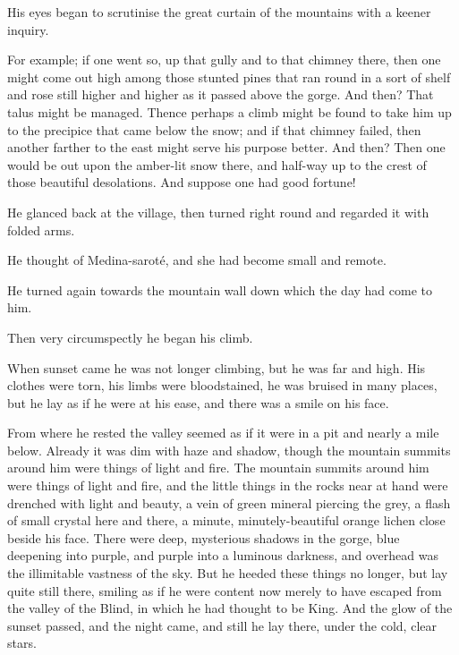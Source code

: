 \documentclass[courier]{sffms}
\begin{document}
His eyes began to scrutinise the great curtain of the mountains with a
keener inquiry.

For example; if one went so, up that gully and to that chimney there,
then one might come out high among those stunted pines that ran round
in a sort of shelf and rose still higher and higher as it passed above
the gorge. And then? That talus might be managed. Thence perhaps a
climb might be found to take him up to the precipice that came below
the snow; and if that chimney failed, then another farther to the east
might serve his purpose better. And then? Then one would be out upon
the amber-lit snow there, and half-way up to the crest of those
beautiful desolations. And suppose one had good fortune!

He glanced back at the village, then turned right round and regarded
it with folded arms.

He thought of Medina-sarot\'e, and she had become small and remote.

He turned again towards the mountain wall down which the day had come
to him.

Then very circumspectly he began his climb.

When sunset came he was not longer climbing, but he was far and
high. His clothes were torn, his limbs were bloodstained, he was
bruised in many places, but he lay as if he were at his ease, and
there was a smile on his face.

From where he rested the valley seemed as if it were in a pit and
nearly a mile below. Already it was dim with haze and shadow, though
the mountain summits around him were things of light and fire. The
mountain summits around him were things of light and fire, and the
little things in the rocks near at hand were drenched with light and
beauty, a vein of green mineral piercing the grey, a flash of small
crystal here and there, a minute, minutely-beautiful orange lichen
close beside his face. There were deep, mysterious shadows in the
gorge, blue deepening into purple, and purple into a luminous
darkness, and overhead was the illimitable vastness of the sky. But he
heeded these things no longer, but lay quite still there, smiling as
if he were content now merely to have escaped from the valley of the
Blind, in which he had thought to be King. And the glow of the sunset
passed, and the night came, and still he lay there, under the cold,
clear stars.
\end{document}

